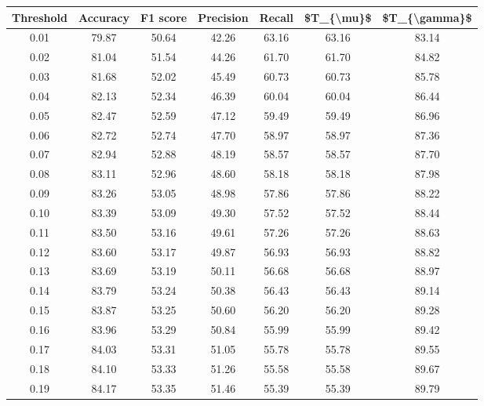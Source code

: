 \begin{tabular}{|c|c|c|c|c|c|c|}
\hline
 Threshold &  Accuracy &  F1 score &  Precision &  Recall &  \$T\_\{\textbackslash mu\}\$ &  \$T\_\{\textbackslash gamma\}\$ \\
\hline
      0.01 &     79.87 &     50.64 &      42.26 &   63.16 &      63.16 &         83.14 \\
      0.02 &     81.04 &     51.54 &      44.26 &   61.70 &      61.70 &         84.82 \\
      0.03 &     81.68 &     52.02 &      45.49 &   60.73 &      60.73 &         85.78 \\
      0.04 &     82.13 &     52.34 &      46.39 &   60.04 &      60.04 &         86.44 \\
      0.05 &     82.47 &     52.59 &      47.12 &   59.49 &      59.49 &         86.96 \\
      0.06 &     82.72 &     52.74 &      47.70 &   58.97 &      58.97 &         87.36 \\
      0.07 &     82.94 &     52.88 &      48.19 &   58.57 &      58.57 &         87.70 \\
      0.08 &     83.11 &     52.96 &      48.60 &   58.18 &      58.18 &         87.98 \\
      0.09 &     83.26 &     53.05 &      48.98 &   57.86 &      57.86 &         88.22 \\
      0.10 &     83.39 &     53.09 &      49.30 &   57.52 &      57.52 &         88.44 \\
      0.11 &     83.50 &     53.16 &      49.61 &   57.26 &      57.26 &         88.63 \\
      0.12 &     83.60 &     53.17 &      49.87 &   56.93 &      56.93 &         88.82 \\
      0.13 &     83.69 &     53.19 &      50.11 &   56.68 &      56.68 &         88.97 \\
      0.14 &     83.79 &     53.24 &      50.38 &   56.43 &      56.43 &         89.14 \\
      0.15 &     83.87 &     53.25 &      50.60 &   56.20 &      56.20 &         89.28 \\
      0.16 &     83.96 &     53.29 &      50.84 &   55.99 &      55.99 &         89.42 \\
      0.17 &     84.03 &     53.31 &      51.05 &   55.78 &      55.78 &         89.55 \\
      0.18 &     84.10 &     53.33 &      51.26 &   55.58 &      55.58 &         89.67 \\
      0.19 &     84.17 &     53.35 &      51.46 &   55.39 &      55.39 &         89.79 \\

\end{tabular}
